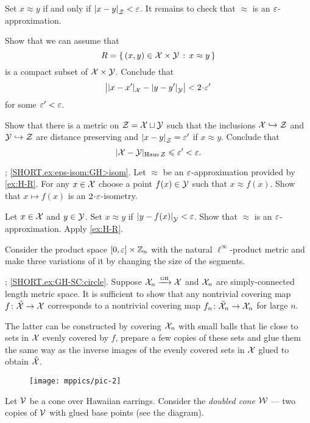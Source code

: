 Set $x\approx y$ if and only if $\dist{x}{y}{\spc{Z}}<\eps$.
It remains to check that $\approx$ is an $\varepsilon$-approximation.

Show that we can assume that 
\[R=\left\{\,{(x,y)\in\mathcal{X}\times\mathcal{Y}}\,:\,{x\approx y}\,\right\}\] is a compact subset of $\mathcal{X}\times\mathcal{Y}$.
Conclude that
\[\bigl|\dist{x}{x'}{\spc{X}}-\dist{y}{y'}{\spc{Y}}\bigr|<2\cdot\eps'\]
for some $\varepsilon'<\varepsilon$.

Show that there is a metric on $\mathcal{Z}=\mathcal{X}\sqcup\mathcal{Y}$ such that the inclusions $\mathcal{X}\hookrightarrow\mathcal{Z}$ and
$\mathcal{Y}\hookrightarrow\mathcal{Z}$ are distance preserving and $\dist{x}{y}{\spc{Z}}=\eps'$ if $x\approx y$.
Conclude that 
\[|\mathcal{X}-\mathcal{Y}|_{\operatorname{\rm Haus}\nolimits \mathcal{Z}}\leqslant\varepsilon'<\varepsilon.\]

\parbf{\ref{ex:eps-isom}};
\ref{SHORT.ex:eps-isom:GH>isom}.
Let $\approx$ be an $\varepsilon$-approximation provided by \ref{ex:H-R}.
For any $x\in\mathcal{X}$ choose a point $f(x)\in\mathcal{Y}$ such that $x\approx f(x)$.
Show that $x\mapsto f(x)$ is an $2\cdot\eps$-isometry.

Let $x\in\mathcal{X}$ and $y\in\mathcal{Y}$.
Set $x\approx y$ if $\dist{y}{f(x)}{\spc{Y}}<\eps$.
Show that $\approx$ is an $\varepsilon$-approximation. 
Apply \ref{ex:H-R}.

Consider the product space $[0,\varepsilon]\times \mathbb{Z}_n$ with the natural $\ell^\infty$-product metric and make three variations of it by changing the size of the segments.

\parbf{\ref{ex:GH-SC}}; \ref{SHORT.ex:GH-SC:circle}.
Suppose $\mathcal{X}_n\xrightarrow{\mbox{\tiny\rm GH}} \mathcal{X}$ and $\mathcal{X}_n$ are simply-connected length metric space.
It is sufficient to show that any nontrivial covering map $f\colon\tilde{\mathcal{X}}\to \mathcal{X}$ corresponds to a nontrivial covering map $f_n\colon\tilde{\mathcal{X}}_n\to \mathcal{X}_n$ for large $n$.

The latter can be constructed by covering $\mathcal{X}_n$ with small balls that lie close to sets in $\mathcal{X}$ evenly covered by $f$, prepare a few copies of these sets and glue them the same way as the inverse images of the evenly covered sets in $\mathcal{X}$ glued to obtain $\tilde{\mathcal{X}}$.

\begin{wrapfigure}{r}{42 mm}
\vskip-4mm
\centering
\texttt{[image: mppics/pic-2]}
\end{wrapfigure}

Let $\mathcal{V}$ be a cone over Hawaiian earrings.
Consider the {}\emph{doubled cone} $\mathcal{W}$ --- two copies of $\mathcal{V}$ with glued base points (see the diagram).

